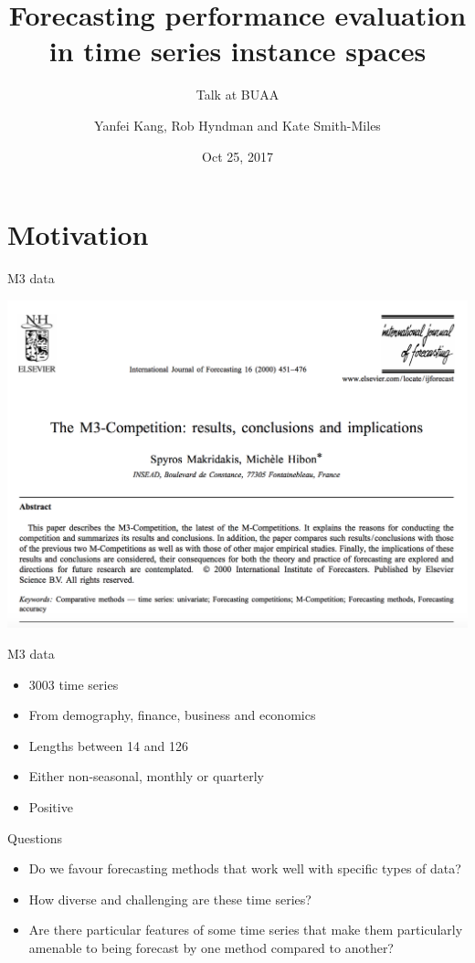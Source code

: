 \documentclass[12pt,ignorenonframetext,compress]{beamer}
\institute{Beihang University}
\title{Forecasting performance evaluation in time series instance spaces}
\subtitle{Talk at BUAA}
\author{Yanfei Kang, Rob Hyndman and Kate Smith-Miles}
\date{Oct 25, 2017}
\providecommand{\tightlist}{%
\setlength{\itemsep}{0pt}\setlength{\parskip}{0pt}}
\begin{document}
\frame{\titlepage}

\section{Motivation}\label{motivation}

\begin{frame}{M3 data}

\centerline{\includegraphics[width=\textwidth]{figures/M3paper.png}}

\end{frame}

\begin{frame}{M3 data}

\begin{itemize}
\tightlist
\item
  3003 time series
\item
  From demography, finance, business and economics
\item
  Lengths between 14 and 126
\item
  Either non-seasonal, monthly or quarterly
\item
  Positive
\end{itemize}

\end{frame}

\begin{frame}{Questions}

\begin{itemize}
\item
  Do we favour forecasting methods that work well with specific types of
  data?
\item
  How diverse and challenging are these time series?
\item
  Are there particular features of some time series that make them
  particularly amenable to being forecast by one method compared to
  another?
\end{itemize}

\end{frame}
\end{document}

